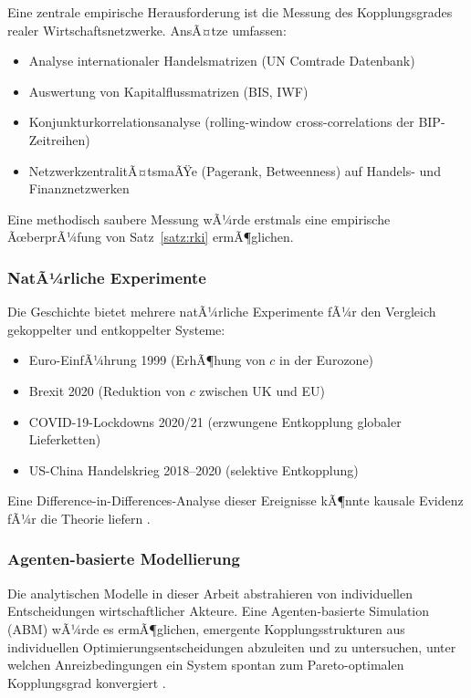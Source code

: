 ﻿\documentclass[a4paper,12pt]{article}
\theoremstyle{definition}
\begin{document}
Eine zentrale empirische Herausforderung ist die Messung des Kopplungsgrades realer
Wirtschaftsnetzwerke. AnsÃ¤tze umfassen:
\begin{itemize}
    \item Analyse internationaler Handelsmatrizen (UN Comtrade Datenbank)
    \item Auswertung von Kapitalflussmatrizen (BIS, IWF)
    \item Konjunkturkorrelationsanalyse (rolling-window cross-correlations der BIP-Zeitreihen)
    \item NetzwerkzentralitÃ¤tsmaÃŸe (Pagerank, Betweenness) auf Handels- und Finanznetzwerken
\end{itemize}
Eine methodisch saubere Messung wÃ¼rde erstmals eine empirische ÃœberprÃ¼fung von
Satz~\ref{satz:rki} ermÃ¶glichen.

\subsubsection{NatÃ¼rliche Experimente}

Die Geschichte bietet mehrere natÃ¼rliche Experimente fÃ¼r den Vergleich gekoppelter und
entkoppelter Systeme:
\begin{itemize}
    \item Euro-EinfÃ¼hrung 1999 (ErhÃ¶hung von $c$ in der Eurozone)
    \item Brexit 2020 (Reduktion von $c$ zwischen UK und EU)
    \item COVID-19-Lockdowns 2020/21 (erzwungene Entkopplung globaler Lieferketten)
    \item US-China Handelskrieg 2018--2020 (selektive Entkopplung)
\end{itemize}
Eine Difference-in-Differences-Analyse dieser Ereignisse kÃ¶nnte kausale Evidenz
fÃ¼r die Theorie liefern \citep{callaway2021difference}.

\subsubsection{Agenten-basierte Modellierung}

Die analytischen Modelle in dieser Arbeit abstrahieren von individuellen Entscheidungen
wirtschaftlicher Akteure. Eine Agenten-basierte Simulation (ABM) wÃ¼rde es ermÃ¶glichen,
emergente Kopplungsstrukturen aus individuellen Optimierungsentscheidungen abzuleiten
und zu untersuchen, unter welchen Anreizbedingungen ein System spontan zum Pareto-optimalen
Kopplungsgrad konvergiert \citep{tesfatsion2006handbook}.
\end{document}
